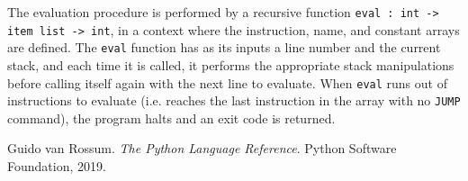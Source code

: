 \documentclass[11pt, twoside]{article}
\begin{document}
    \indent The evaluation procedure is performed by a recursive function \texttt{eval : int -> item list -> int}, in a context where the instruction, name, and constant arrays are defined. The \texttt{eval} function has as its inputs a line number and the current stack, and each time it is called, it performs the appropriate stack manipulations before calling itself again with the next line to evaluate. When \texttt{eval} runs out of instructions to evaluate (i.e. reaches the last instruction in the array with no \texttt{JUMP} command), the program halts and an exit code is returned.


\begin{thebibliography}{1}
     Guido van Rossum. \textit{The Python Language Reference}. Python Software Foundation, 2019.
\end{thebibliography}
\end{document}
